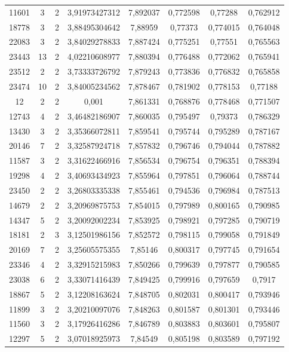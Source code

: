 \begin{longtable}{|c|c|c|c|c|c|c|c|}
11601 & 3 & 2 & 3,91973427312 & 7,892037 & 0,772598 & 0,77288 & 0,762912 \\
18778 & 3 & 2 & 3,88495304642 & 7,88959 & 0,77373 & 0,774015 & 0,764048 \\
22083 & 3 & 2 & 3,84029278833 & 7,887424 & 0,775251 & 0,77551 & 0,765563 \\
23443 & 13 & 2 & 4,02210608977 & 7,880394 & 0,776488 & 0,772062 & 0,765941 \\
23512 & 2 & 2 & 3,73333726792 & 7,879243 & 0,773836 & 0,776832 & 0,765858 \\
23474 & 10 & 2 & 3,84005234562 & 7,878467 & 0,781902 & 0,778153 & 0,77188 \\
12    & 2 & 2 & 0,001 & 7,861331 & 0,768876 & 0,778468 & 0,771507 \\
12743 & 4 & 2 & 3,46482186907 & 7,860035 & 0,795497 & 0,79373 & 0,786329 \\
13430 & 3 & 2 & 3,35366072811 & 7,859541 & 0,795744 & 0,795289 & 0,787167 \\
20146 & 7 & 2 & 3,32587924718 & 7,857832 & 0,796746 & 0,794044 & 0,787882 \\
11587 & 3 & 2 & 3,31622466916 & 7,856534 & 0,796754 & 0,796351 & 0,788394 \\
19298 & 4 & 2 & 3,40693434923 & 7,855964 & 0,797851 & 0,796064 & 0,788744 \\
23450 & 2 & 2 & 3,26803335338 & 7,855461 & 0,794536 & 0,796984 & 0,787513 \\
14679 & 2 & 2 & 3,20969875753 & 7,854015 & 0,797989 & 0,800165 & 0,790985 \\
14347 & 5 & 2 & 3,20092002234 & 7,853925 & 0,798921 & 0,797285 & 0,790719 \\
18181 & 2 & 3 & 3,12501986156 & 7,852572 & 0,798115 & 0,799058 & 0,791849 \\
20169 & 7 & 2 & 3,25605575355 & 7,85146 & 0,800317 & 0,797745 & 0,791654 \\
23346 & 4 & 2 & 3,32915215983 & 7,850266 & 0,799639 & 0,797877 & 0,790585 \\
23038 & 6 & 2 & 3,33071416439 & 7,849425 & 0,799916 & 0,797659 & 0,7917 \\
18867 & 5 & 2 & 3,12208163624 & 7,848705 & 0,802031 & 0,800417 & 0,793946 \\
11899 & 3 & 2 & 3,20210097076 & 7,848263 & 0,801587 & 0,801301 & 0,793446 \\
11560 & 3 & 2 & 3,17926416286 & 7,846789 & 0,803883 & 0,803601 & 0,795807 \\
12297 & 5 & 2 & 3,07018925973 & 7,84549 & 0,805198 & 0,803589 & 0,797192 \\

\end{longtable}

